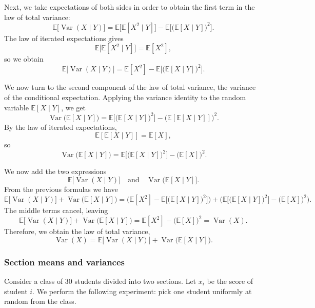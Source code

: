 Next, we take expectations of both sides in order to obtain the first term in the law of total variance:
\[
\mathbb{E}\big[\operatorname{Var}(X \mid Y)\big]
=
\mathbb{E}\big[\mathbb{E}[X^{2} \mid Y]\big]
-
\mathbb{E}\big[\big(\mathbb{E}[X \mid Y]\big)^{2}\big].
\]
The law of iterated expectations gives
\[
\mathbb{E}\big[\mathbb{E}[X^{2} \mid Y]\big] = \mathbb{E}[X^{2}],
\]
so we obtain
\[
\mathbb{E}\big[\operatorname{Var}(X \mid Y)\big]
=
\mathbb{E}[X^{2}]
-
\mathbb{E}\big[\big(\mathbb{E}[X \mid Y]\big)^{2}\big].
\]

We now turn to the second component of the law of total variance, the variance of the conditional expectation.  
Applying the variance identity to the random variable \(\mathbb{E}[X \mid Y]\), we get
\[
\operatorname{Var}\big(\mathbb{E}[X \mid Y]\big)
=
\mathbb{E}\big[\big(\mathbb{E}[X \mid Y]\big)^{2}\big]
-
\big(\mathbb{E}[\mathbb{E}[X \mid Y]]\big)^{2}.
\]
By the law of iterated expectations,
\[
\mathbb{E}[\mathbb{E}[X \mid Y]] = \mathbb{E}[X],
\]
so
\[
\operatorname{Var}\big(\mathbb{E}[X \mid Y]\big)
=
\mathbb{E}\big[\big(\mathbb{E}[X \mid Y]\big)^{2}\big]
-
\big(\mathbb{E}[X]\big)^{2}.
\]

We now add the two expressions
\[
\mathbb{E}\big[\operatorname{Var}(X \mid Y)\big]
\quad\text{and}\quad
\operatorname{Var}\big(\mathbb{E}[X \mid Y]\big].
\]
From the previous formulas we have
\[
\mathbb{E}\big[\operatorname{Var}(X \mid Y)\big]
+
\operatorname{Var}\big(\mathbb{E}[X \mid Y]\big)
=
\Big(\mathbb{E}[X^{2}]
-
\mathbb{E}\big[\big(\mathbb{E}[X \mid Y]\big)^{2}\big]\Big)
+
\Big(\mathbb{E}\big[\big(\mathbb{E}[X \mid Y]\big)^{2}\big]
-
\big(\mathbb{E}[X]\big)^{2}\Big).
\]
The middle terms cancel, leaving
\[
\mathbb{E}\big[\operatorname{Var}(X \mid Y)\big]
+
\operatorname{Var}\big(\mathbb{E}[X \mid Y]\big)
=
\mathbb{E}[X^{2}]
-
\big(\mathbb{E}[X]\big)^{2}
=
\operatorname{Var}(X).
\]
Therefore, we obtain the law of total variance,
\[
\operatorname{Var}(X)
=
\mathbb{E}\big[\operatorname{Var}(X \mid Y)\big]
+
\operatorname{Var}\big(\mathbb{E}[X \mid Y]\big).
\]


\subsubsection{Section means and variances}

Consider a class of 30 students divided into two sections.  
Let \(x_i\) be the score of student \(i\).  
We perform the following experiment: pick one student uniformly at random from the class.

